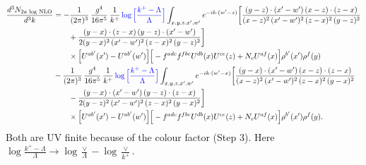 \documentclass[10pt]{article}
\numberwithin{equation}{section}
\begin{document}
\begin{align}
\frac{d^{3}N_{2a\,\log\,\rm NLO}}{d^{3}k}&=-\frac{1}{(2\pi)^{3}}\,\frac{g^{4}}{16\pi^{5}}\,\frac{1}{k^{+}}\,{\color{blue}\log\Big[\frac{k^{+}-\Lambda}{\Lambda}\Big]}\int_{x,y,z,x',w'}e^{-ik\cdot(w'-z)}\bigg[\frac{(y-z)\cdot (x'-w')\,(x-z)\cdot (z-x)}{(x-z)^{2}\,(x'-w')^{2}\,(z-x)^{2}\,(y-z)^{2}}\notag\\
&\qquad+\frac{(y-x)\cdot (z-x)\,(y-z)\cdot (x'-w')}{2(y-x)^{2}\,(x'-w')^{2}\,(z-x)^{2}\,(y-z)^{2}}\bigg]\notag\\&\qquad\times\Big[U^{ab'}(x')-U^{ab'}(w')\Big]\Big[-f^{adc}f^{fbe}U^{db}(x)U^{ce}(z)+N_{c}U^{af}(x)\Big]\rho^{b'}(x')\rho^{f}(y)\notag\\
&-\frac{1}{(2\pi)^{3}}\,\frac{g^{4}}{16\pi^{5}}\,\frac{1}{k^{+}}\,{\color{blue}\log\Big[\frac{k^{+}-\Lambda}{\Lambda}\Big]}\int_{x,y,z,x',w'}e^{-ik\cdot(w'-x)}\bigg[\frac{(y-x)\cdot (x'-w')\,(x-z)\cdot (z-x)}{(x-z)^{2}\,(x'-w')^{2}\,(z-x)^{2}\,(y-x)^{2}}\notag\\
&\qquad-\frac{(y-x)\cdot (x'-w')\,(y-z)\cdot (z-x)}{2(y-z)^{2}\,(x'-w')^{2}\,(z-x)^{2}\,(y-x)^{2}}\bigg]\notag\\&\qquad\times\Big[U^{ab'}(x')-U^{ab'}(w')\Big]\Big[-f^{adc}f^{fbe}U^{db}(x)U^{ce}(z)+N_{c}U^{af}(x)\Big]\rho^{b'}(x')\rho^{f}(y).
\label{eq:N2alog}
\end{align}
Both are UV finite because of the colour factor (Step 3). Here $\log\frac{k^{+}-\Lambda}{\Lambda}\to\log\frac{\vee}{\Lambda}-\log\frac{\vee}{k^{+}}$.
\end{document}
